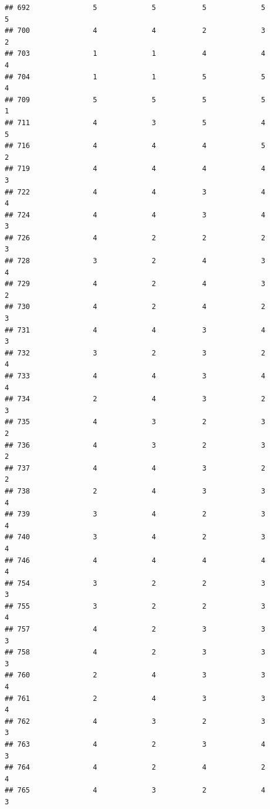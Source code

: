 \documentclass[
]{article}
\begin{document}
\begin{verbatim}
## 692               5             5           5             5            5
## 700               4             4           2             3            2
## 703               1             1           4             4            4
## 704               1             1           5             5            4
## 709               5             5           5             5            1
## 711               4             3           5             4            5
## 716               4             4           4             5            2
## 719               4             4           4             4            3
## 722               4             4           3             4            4
## 724               4             4           3             4            3
## 726               4             2           2             2            3
## 728               3             2           4             3            4
## 729               4             2           4             3            2
## 730               4             2           4             2            3
## 731               4             4           3             4            3
## 732               3             2           3             2            4
## 733               4             4           3             4            4
## 734               2             4           3             2            3
## 735               4             3           2             3            2
## 736               4             3           2             3            2
## 737               4             4           3             2            2
## 738               2             4           3             3            4
## 739               3             4           2             3            4
## 740               3             4           2             3            4
## 746               4             4           4             4            4
## 754               3             2           2             3            3
## 755               3             2           2             3            4
## 757               4             2           3             3            3
## 758               4             2           3             3            3
## 760               2             4           3             3            4
## 761               2             4           3             3            4
## 762               4             3           2             3            3
## 763               4             2           3             4            3
## 764               4             2           4             2            4
## 765               4             3           2             4            3

\end{verbatim}
\end{document}
